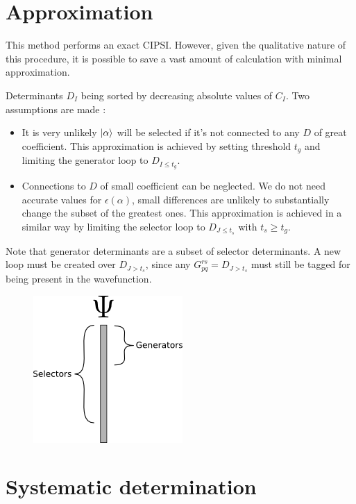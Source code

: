 \section{Approximation}

This method performs an exact CIPSI. However, given the qualitative nature of this procedure, it is possible to save a vast amount of calculation with minimal approximation.

Determinants $D_I$ being sorted by decreasing absolute values of $C_I$. Two assumptions are made :
\begin{itemize}
\item
It is very unlikely $| \alpha \rangle$ will be selected if it's not connected to any $D$ of great coefficient. This approximation is achieved by setting threshold $t_g$ and limiting the generator loop to $D_{I \leq t_g}$.
\item
Connections to $D$ of small coefficient can be neglected. We do not need accurate values for $\epsilon(\alpha)$, small differences are unlikely to substantially change the subset of the greatest ones. This approximation is achieved in a similar way by limiting the selector loop to $D_{J \leq t_s}$ with $t_s \geq t_g$.
\end{itemize}

Note that generator determinants are a subset of selector determinants.
A new loop must be created over $D_{J > t_s}$, since any $G_{pq}^{rs}=D_{J > t_s}$ must still be tagged for being present in the wavefunction.

\begin{figure}[h!]
	\begin{center}
		\includegraphics[width=0.4\columnwidth]{figures/cipsi/selexemple2}
		\caption{{\label{selexemple2}%
		}}
	\end{center}
\end{figure}






\section{Systematic determination}


